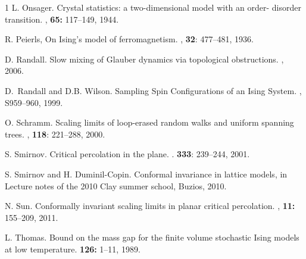 \documentclass[letterpaper,english,numberwithinsect]{amsart}
\begin{document}
\begin{thebibliography}{1}
\label{onsager}
L. Onsager.
\newblock Crystal statistics: a two-dimensional model with an order- disorder transition.
,  {\bf 65:} 117–149, 1944.


\label{peierls}
R. Peierls, 
\newblock On Ising's model of ferromagnetism. 
, {\bf 32}: 477--481,
1936.

\label{randall-top}
D. Randall.
\newblock Slow mixing of Glauber dynamics via topological obstructions. 
, 2006. 

\label{rw}
D.~Randall and D.B. Wilson.
\newblock Sampling Spin Configurations of an Ising System.
, S959--960,
 1999.

\label{schramm}
O. Schramm.
\newblock Scaling limits of loop-erased random walks and uniform spanning trees. 
, {\bf 118}: 221--288, 2000.


S. Smirnov. 
\newblock Critical percolation in the plane.
. {\bf 333}: 239--244, 2001.

\label{sdc}
S. Smirnov and H. Duminil-Copin.
\newblock Conformal invariance in lattice models, in Lecture notes of the 2010 Clay summer school, Buzios, 2010.

\label{sun}
N. Sun.
\newblock Conformally invariant scaling limits in planar critical percolation.
, {\bf 11:} 155--209, 2011.

\label{thomas}
L. Thomas.
\newblock Bound on the mass gap for the finite volume stochastic Ising models at low temperature.
 {\bf 126:} 1--11, 1989.

\end{thebibliography}
\end{document}
